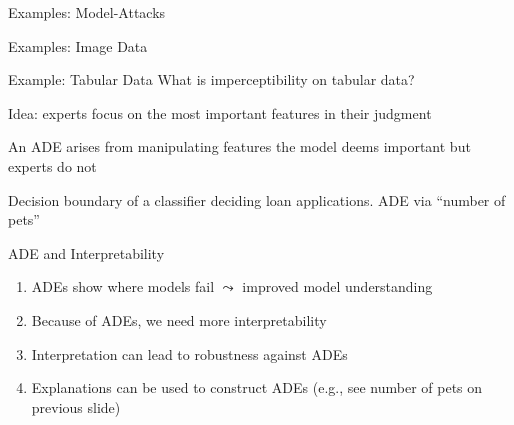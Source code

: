 \documentclass[10pt,compress,t,notes=noshow, xcolor=table]{beamer}
\begin{document}
\begin{framev}[align=top]{Examples: Model-Attacks }
\end{framev}


\begin{framev}[align=top]{Examples: Image Data  }
\spacer[0.25]
\end{framev}


\begin{framev}[align=top]{Example: Tabular Data }
What is imperceptibility on tabular data?
\begin{itemizeM}
\item Idea: experts focus on the most important features in their judgment
\item An ADE arises from manipulating features the model deems important but experts do not
\end{itemizeM}
{\centering Decision boundary of a classifier deciding loan applications. ADE via ``number of pets''\par}
\end{framev}


\begin{framev}[align=top]{ADE and Interpretability}
\begin{enumerate}
\item ADEs show where models fail $\leadsto$ improved model understanding
\item Because of ADEs, we need more interpretability
\item Interpretation can lead to robustness against ADEs
\item Explanations can be used to construct ADEs (e.g., see number of pets on previous slide)
\end{enumerate}
\end{framev}
\end{document}
